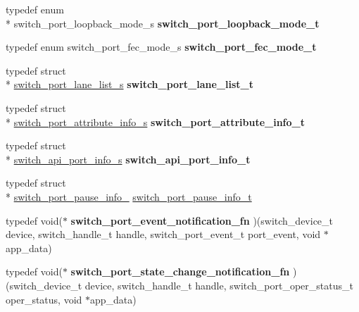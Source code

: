 \begin{DoxyCompactItemize}
\item 
\hypertarget{group__Port_gac7f14c2a22354c51fab819878fb1983e}{typedef enum \\*
switch\+\_\+port\+\_\+loopback\+\_\+mode\+\_\+s {\bfseries switch\+\_\+port\+\_\+loopback\+\_\+mode\+\_\+t}}\label{group__Port_gac7f14c2a22354c51fab819878fb1983e}

\item 
\hypertarget{group__Port_gaa045a2c5532dac3b81f497be2e4921e0}{typedef enum switch\+\_\+port\+\_\+fec\+\_\+mode\+\_\+s {\bfseries switch\+\_\+port\+\_\+fec\+\_\+mode\+\_\+t}}\label{group__Port_gaa045a2c5532dac3b81f497be2e4921e0}

\item 
\hypertarget{group__Port_ga06a4775fb9b8e3ed8f6fe380fc5987d7}{typedef struct \\*
\hyperlink{structswitch__port__lane__list__s}{switch\+\_\+port\+\_\+lane\+\_\+list\+\_\+s} {\bfseries switch\+\_\+port\+\_\+lane\+\_\+list\+\_\+t}}\label{group__Port_ga06a4775fb9b8e3ed8f6fe380fc5987d7}

\item 
\hypertarget{group__Port_gabfc6f5421ee471f9ca99efa1357584cd}{typedef struct \\*
\hyperlink{structswitch__port__attribute__info__s}{switch\+\_\+port\+\_\+attribute\+\_\+info\+\_\+s} {\bfseries switch\+\_\+port\+\_\+attribute\+\_\+info\+\_\+t}}\label{group__Port_gabfc6f5421ee471f9ca99efa1357584cd}

\item 
\hypertarget{group__Port_ga7960b44bff00d9cf41c78687348dea8a}{typedef struct \\*
\hyperlink{structswitch__api__port__info__s}{switch\+\_\+api\+\_\+port\+\_\+info\+\_\+s} {\bfseries switch\+\_\+api\+\_\+port\+\_\+info\+\_\+t}}\label{group__Port_ga7960b44bff00d9cf41c78687348dea8a}

\item 
typedef struct \\*
\hyperlink{structswitch__port__pause__info__}{switch\+\_\+port\+\_\+pause\+\_\+info\+\_\+} \hyperlink{group__Port_ga37bc62721944eb5c3a0e123be73a0a3a}{switch\+\_\+port\+\_\+pause\+\_\+info\+\_\+t}
\item 
\hypertarget{group__Port_ga595e7e8f4876b0fa74eae61fb118d258}{typedef void($\ast$ {\bfseries switch\+\_\+port\+\_\+event\+\_\+notification\+\_\+fn} )(switch\+\_\+device\+\_\+t device, switch\+\_\+handle\+\_\+t handle, switch\+\_\+port\+\_\+event\+\_\+t port\+\_\+event, void $\ast$app\+\_\+data)}\label{group__Port_ga595e7e8f4876b0fa74eae61fb118d258}

\item 
\hypertarget{group__Port_ga4d368aabcfa975110ac867532c772d73}{typedef void($\ast$ {\bfseries switch\+\_\+port\+\_\+state\+\_\+change\+\_\+notification\+\_\+fn} )(switch\+\_\+device\+\_\+t device, switch\+\_\+handle\+\_\+t handle, switch\+\_\+port\+\_\+oper\+\_\+status\+\_\+t oper\+\_\+status, void $\ast$app\+\_\+data)}\label{group__Port_ga4d368aabcfa975110ac867532c772d73}

\end{DoxyCompactItemize}
